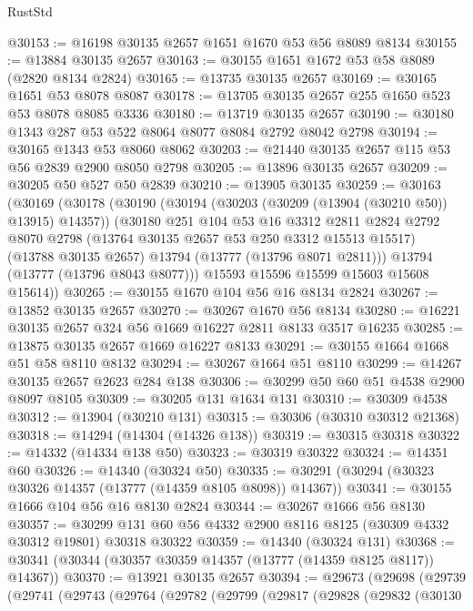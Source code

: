 \begin{lexlean}{RustStd}
\begin{coremodule}
@30153 := @16198 @30135 @2657 @1651 @1670 @53 @56 @8089 @8134
@30155 := @13884 @30135 @2657
@30163 := @30155 @1651 @1672 @53 @58 @8089 (@2820 @8134 @2824)
@30165 := @13735 @30135 @2657
@30169 := @30165 @1651 @53 @8078 @8087
@30178 := @13705 @30135 @2657 @255 @1650 @523 @53 @8078 @8085 @3336
@30180 := @13719 @30135 @2657
@30190 := @30180 @1343 @287 @53 @522 @8064 @8077 @8084 @2792 @8042 @2798
@30194 := @30165 @1343 @53 @8060 @8062
@30203 := @21440 @30135 @2657 @115 @53 @56 @2839 @2900 @8050 @2798
@30205 := @13896 @30135 @2657
@30209 := @30205 @50 @527 @50 @2839
@30210 := @13905 @30135
@30259 := @30163
    (@30169
      (@30178
        (@30190
          (@30194 (@30203 (@30209 (@13904 (@30210 @50)) @13915) @14357))
          (@30180
            @251
            @104
            @53
            @16
            @3312
            @2811
            @2824
            @2792
            @8070
            @2798
            (@13764 @30135 @2657 @53 @250 @3312 @15513 @15517)
            (@13788 @30135 @2657)
            @13794
            (@13777 (@13796 @8071 @2811)))
          @13794
          (@13777 (@13796 @8043 @8077)))
        @15593
        @15596
        @15599
        @15603
        @15608
        @15614))
@30265 := @30155 @1670 @104 @56 @16 @8134 @2824
@30267 := @13852 @30135 @2657
@30270 := @30267 @1670 @56 @8134
@30280 := @16221 @30135 @2657 @324 @56 @1669 @16227 @2811 @8133 @3517 @16235
@30285 := @13875 @30135 @2657 @1669 @16227 @8133
@30291 := @30155 @1664 @1668 @51 @58 @8110 @8132
@30294 := @30267 @1664 @51 @8110
@30299 := @14267 @30135 @2657 @2623 @284 @138
@30306 := @30299 @50 @60 @51 @4538 @2900 @8097 @8105
@30309 := @30205 @131 @1634 @131
@30310 := @30309 @4538
@30312 := @13904 (@30210 @131)
@30315 := @30306 (@30310 @30312 @21368)
@30318 := @14294 (@14304 (@14326 @138))
@30319 := @30315 @30318
@30322 := @14332 (@14334 @138 @50)
@30323 := @30319 @30322
@30324 := @14351 @60
@30326 := @14340 (@30324 @50)
@30335 := @30291 (@30294 (@30323 @30326 @14357 (@13777 (@14359 @8105 @8098)) @14367))
@30341 := @30155 @1666 @104 @56 @16 @8130 @2824
@30344 := @30267 @1666 @56 @8130
@30357 := @30299 @131 @60 @56 @4332 @2900 @8116 @8125 (@30309 @4332 @30312 @19801) @30318 @30322
@30359 := @14340 (@30324 @131)
@30368 := @30341 (@30344 (@30357 @30359 @14357 (@13777 (@14359 @8125 @8117)) @14367))
@30370 := @13921 @30135 @2657
@30394 := @29673
    (@29698
      (@29739
        (@29741
          (@29743
            (@29764
              (@29782
                (@29799
                  (@29817
                    (@29828
                      (@29832
                        (@30130

\end{coremodule}
\end{lexlean}
